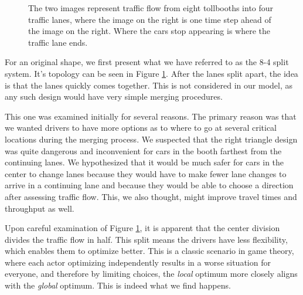 \documentclass[a4paper, 11pt]{article}
\begin{document}
\begin{figure}[H]
\begin{center}
\begin{tabular}{c c}
\end{tabular}
\end{center}
\caption{The two images represent traffic flow from eight tollbooths into four traffic lanes, where the image on the right is one time step ahead of the image on the right. Where the cars stop appearing is where the traffic lane ends. }
\label{fig:48_split}
\end{figure}

For an original shape, we first present what we have referred to as the 8-4 split system. It's topology can be seen in Figure  \ref{fig:48_split}. After the lanes split apart, the idea is that the lanes quickly comes together. This is not considered in our model, as any such design would have very simple merging procedures. 



This one was examined initially for several reasons. The primary reason was that we wanted drivers to have more options as to where to go at several critical locations during the merging process. We suspected that the right triangle design was quite dangerous and inconvenient for cars in the booth farthest from the continuing lanes. We hypothesized that it would be much safer for cars in the center to change lanes because they would have to make fewer lane changes to arrive in a continuing lane and because they would be able to choose a direction after assessing traffic flow. This, we also thought, might improve travel times and throughput as well. 

Upon careful examination of Figure \ref{fig:48_split}, it is apparent that the center division divides the traffic flow in half. This split means the drivers have less flexibility, which enables them to optimize better. This is a classic scenario in game theory, where each actor optimizing independently results in a worse situation for everyone, and therefore by limiting choices, the \textit{local} optimum more closely aligns with the \textit{global} optimum. This is indeed what we find happens. 
\end{document}
